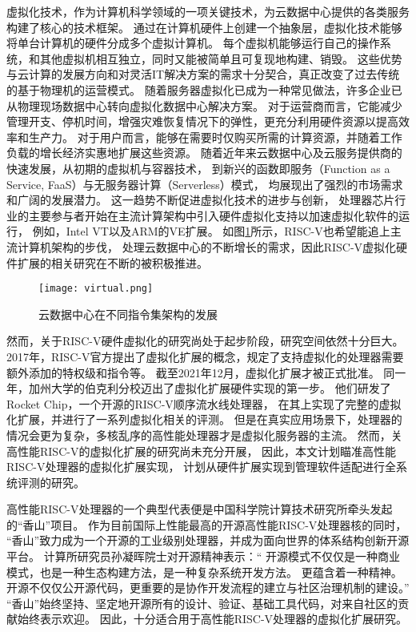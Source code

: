 虚拟化技术，作为计算机科学领域的一项关键技术，为云数据中心提供的各类服务构建了核心的技术框架。
通过在计算机硬件上创建一个抽象层，虚拟化技术能够将单台计算机的硬件分成多个虚拟计算机。
每个虚拟机能够运行自己的操作系统，和其他虚拟机相互独立，同时又能被简单且可复现地构建、销毁。
这些优势与云计算的发展方向和对灵活IT解决方案的需求十分契合，真正改变了过去传统的基于物理机的运营模式。
随着服务器虚拟化已成为一种常见做法，许多企业已从物理现场数据中心转向虚拟化数据中心解决方案。
对于运营商而言，它能减少管理开支、停机时间，增强灾难恢复情况下的弹性，更充分利用硬件资源以提高效率和生产力。
对于用户而言，能够在需要时仅购买所需的计算资源，并随着工作负载的增长经济实惠地扩展这些资源。
随着近年来云数据中心及云服务提供商的快速发展，从初期的虚拟机与容器技术，
到新兴的函数即服务（Function as a Service, FaaS）与无服务器计算（Serverless）模式，
均展现出了强烈的市场需求和广阔的发展潜力。
这一趋势不断促进虚拟化技术的进步与创新，
处理器芯片行业的主要参与者开始在主流计算架构中引入硬件虚拟化支持以加速虚拟化软件的运行，
例如，Intel VT\cite{intel-VT2005Computer}以及ARM的VE扩展\cite{armve2018}。
如图\ref{fig:isa-vir}所示，RISC-V也希望能追上主流计算机架构的步伐，
处理云数据中心的不断增长的需求，因此RISC-V虚拟化硬件扩展的相关研究在不断的被积极推进。

\begin{figure}[htbp]
\centering
\texttt{[image: virtual.png]}
\caption{云数据中心在不同指令集架构的发展}
\label{fig:isa-vir}
\end{figure}

然而，关于RISC-V硬件虚拟化的研究尚处于起步阶段，研究空间依然十分巨大。
2017年，RISC-V官方提出了虚拟化扩展的概念，规定了支持虚拟化的处理器需要额外添加的特权级和指令等。
截至2021年12月，虚拟化扩展才被正式批准。
同一年，加州大学的伯克利分校迈出了虚拟化扩展硬件实现的第一步。
他们研发了Rocket Chip\cite{itco2022rocket}，一个开源的RISC-V顺序流水线处理器，
在其上实现了完整的虚拟化扩展，并进行了一系列虚拟化相关的评测。
但是在真实应用场景下，处理器的情况会更为复杂，多核乱序的高性能处理器才是虚拟化服务器的主流。
然而，关高性能RISC-V的虚拟化扩展的研究尚未充分开展，
因此，本文计划瞄准高性能RISC-V处理器的虚拟化扩展实现，
计划从硬件扩展实现到管理软件适配进行全系统评测的研究。

高性能RISC-V处理器的一个典型代表便是中国科学院计算技术研究所牵头发起的“香山”项目。
作为目前国际上性能最高的开源高性能RISC-V处理器核的同时，
“香山”致力成为一个开源的工业级别处理器，并成为面向世界的体系结构创新开源平台。
计算所研究员孙凝晖院士对开源精神表示：“
开源模式不仅仅是一种商业模式，也是一种生态构建方法，是一种复杂系统开发方法。
更蕴含着一种精神。开源不仅仅公开源代码，更重要的是协作开发流程的建立与社区治理机制的建设。”
“香山”始终坚持、坚定地开源所有的设计、验证、基础工具代码，对来自社区的贡献始终表示欢迎。
因此，十分适合用于高性能RISC-V处理器的虚拟化扩展研究。


